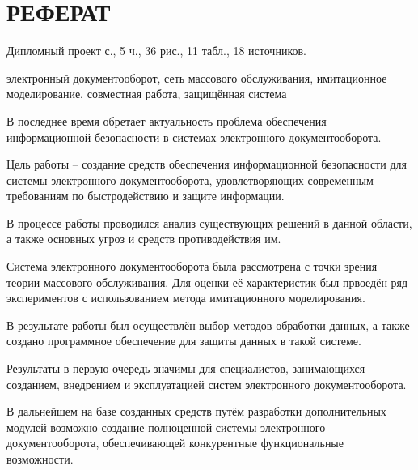 \chapter*{РЕФЕРАТ}							%

Дипломный проект \pageref*{LastPage} с., 5 ч., 36 рис., 11 табл., 18 источников.

\vspace{\baselineskip}
электронный документооборот, сеть массового обслуживания, имитационное моделирование, совместная работа, защищённая система

\vspace{\baselineskip}
В последнее время обретает актуальность проблема обеспечения информационной безопасности в системах электронного документооборота. 

Цель работы – создание средств обеспечения информационной безопасности для системы электронного документооборота, удовлетворяющих современным требованиям по быстродействию и защите информации.

В процессе работы проводился анализ существующих решений в данной области, а также основных угроз и средств противодействия им.

Система электронного документооборота была рассмотрена с точки зрения теории массового обслуживания. Для оценки её характеристик был првоедён ряд экспериментов с использованием метода имитационного моделирования.

В результате работы был осуществлён выбор методов обработки данных, а также создано программное обеспечение для защиты данных в такой системе.

Результаты в первую очередь значимы для специалистов, занимающихся созданием, внедрением и эксплуатацией систем электронного документооборота.

В дальнейшем на базе созданных средств путём разработки дополнительных модулей возможно создание полноценной системы электронного документооборота, обеспечивающей конкурентные функциональные возможности.

\clearpage
